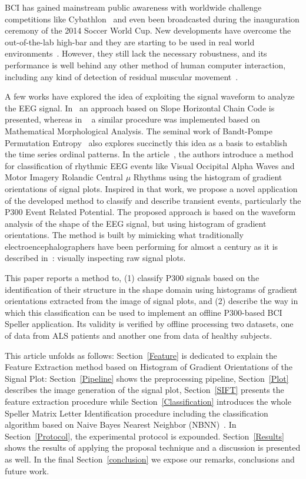 \documentclass[utf8]{frontiersSCNS} %
\begin{document}
BCI has gained mainstream public awareness with worldwide challenge competitions like Cybathlon~\citep{Riener2014} and even been broadcasted during the inauguration ceremony of the 2014 Soccer World Cup.  New developments have overcome the out-of-the-lab high-bar and they are starting to be used in real world environments~\citep{Guger2017,Huggins2016}.  However, they still lack the necessary robustness, and its performance is well behind any other method of human computer interaction, including any kind of detection of residual muscular movement~\citep{Clerc}.

A few works have explored the idea of exploiting the signal waveform to analyze the EEG signal.  In~\citep{Alvarado-Gonzalez2016} an approach based on Slope Horizontal Chain Code is presented, whereas in ~\citep{Yamaguchi2009} a similar procedure was implemented based on Mathematical Morphological Analysis.  The seminal work of Bandt-Pompe Permutation Entropy~\citep{Berger2017} also explores succinctly this idea as a basis to establish the time series ordinal patterns.  In the article~\citep{Ramele2016},  the authors introduce a method for classification of rhythmic EEG events like Visual Occipital Alpha Waves  and Motor Imagery Rolandic Central $\mu$ Rhythms using the histogram of gradient orientations of signal plots.  Inspired in that work, we propose a novel application of the developed method to classify and describe transient events, particularly the P300 Event Related Potential.  
The proposed approach is based on the waveform analysis of the shape of the EEG signal, but using histogram of gradient orientations. The method is built by mimicking what traditionally electroencephalographers have been performing for almost a century as it is described in~\citep{Hartman2005}: visually inspecting raw signal plots.

This paper reports a method to, (1) classify P300 signals based on the identification of their structure in the shape domain using histograms of gradient orientations extracted from the image of signal plots, and (2) describe the way in which this classification can be used to implement an offline P300-based BCI Speller application. Its validity is verified by offline processing two datasets, one of data from ALS patients and another one from data of healthy subjects. 

This article unfolds as follows: Section~\ref{Feature} is dedicated to explain the Feature Extraction method based on Histogram of Gradient Orientations of the Signal Plot: Section~\ref{Pipeline} shows the preprocessing pipeline,  Section~\ref{Plot}  describes the image generation of the signal plot, Section~\ref{SIFT}  presents the feature extraction procedure while  Section~\ref{Classification}  introduces the whole  Speller Matrix Letter Identification procedure including the classification algorithm based on Naive Bayes Nearest Neighbor (NBNN)~\citep{Boiman2008}. In Section~\ref{Protocol}, the experimental protocol is expounded. Section~\ref{Results} shows the results of applying the proposal technique and a discussion is presented as well.
In the final Section~\ref{conclusion}  we expose our remarks, conclusions and future work.
\end{document}
